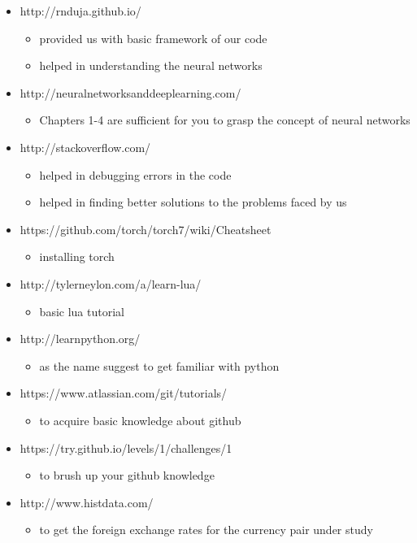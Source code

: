 \documentclass{article}
\begin{document}
	\begin{itemize}
		\item http://rnduja.github.io/ 
 			\begin{itemize}
				\item provided us with basic framework of our code
				\item helped in understanding the neural networks
			\end{itemize}
		\item  http://neuralnetworksanddeeplearning.com/
			\begin{itemize}
				\item Chapters 1-4 are sufficient for you to grasp the concept of neural networks
			\end{itemize}
		\item http://stackoverflow.com/
			\begin{itemize}
				\item helped in debugging errors in the code
				\item helped in finding better solutions to the problems faced by us
			\end{itemize}
		\item https://github.com/torch/torch7/wiki/Cheatsheet
			\begin{itemize}
				\item installing torch
			\end{itemize}
		\item http://tylerneylon.com/a/learn-lua/
			\begin{itemize}
				\item basic lua tutorial
			\end{itemize}
		\item http://learnpython.org/
			\begin{itemize}
				\item as the name suggest to get familiar with python
			\end{itemize}
		\item https://www.atlassian.com/git/tutorials/
			\begin{itemize}
				\item to acquire basic knowledge about github
			\end{itemize}
		\item https://try.github.io/levels/1/challenges/1
			\begin{itemize}
				\item to brush up your github knowledge
			\end{itemize}
		\item http://www.histdata.com/
			\begin{itemize}
				\item to get the foreign exchange rates for the currency pair under study
			\end{itemize}
	\end{itemize}
 
\end{document}
